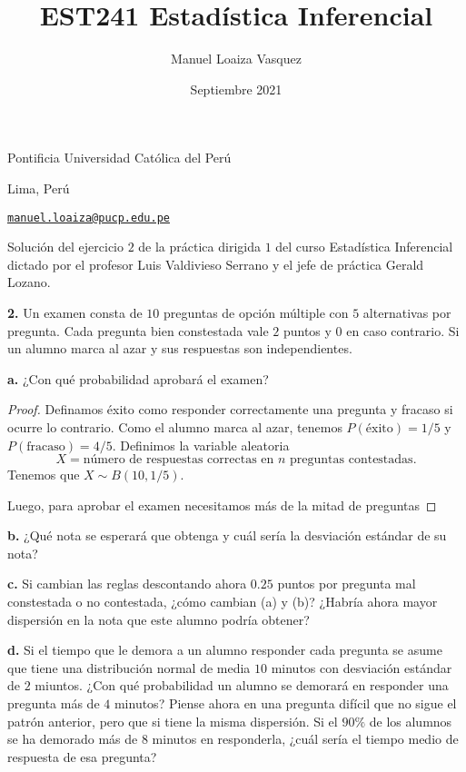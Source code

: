 \documentclass{article}
\title{EST241 Estad\'istica Inferencial}
\author{Manuel Loaiza Vasquez}
\date{Septiembre 2021}
\newenvironment{statement}[1]{\smallskip\noindent\color[rgb]{1.00,0.00,0.50} {\bf #1.}}{}
\theoremstyle{definition}
\theoremstyle{remark}
\begin{document}
\maketitle

\vspace*{-0.25in}
\centerline{Pontificia Universidad Cat\'olica del Per\'u}
\centerline{Lima, Per\'u}
\centerline{\href{mailto:manuel.loaiza@pucp.edu.pe}{{\tt manuel.loaiza@pucp.edu.pe}}}
\vspace*{0.15in}

\begin{framed}
  Soluci\'on del ejercicio $2$ de la pr\'actica dirigida $1$ del curso
  Estad\'istica Inferencial dictado por el profesor Luis Valdivieso Serrano
  y el jefe de pr\'actica Gerald Lozano.
\end{framed}

\begin{statement}{2}
    Un examen consta de $10$ preguntas de opci\'on m\'ultiple con $5$
    alternativas por pregunta.
    Cada pregunta bien constestada vale $2$ puntos y $0$ en caso contrario.
    Si un alumno marca al azar y sus respuestas son independientes.
\end{statement}

\begin{statement}{a}
  ¿Con qu\'e probabilidad aprobar\'a el examen?
\end{statement}

\begin{proof}
  Definamos \'exito como responder correctamente una pregunta y fracaso
  si ocurre lo contrario. Como el alumno marca al azar, tenemos
  $P(\text{\'exito}) = 1 / 5$ y $P(\text{fracaso}) = 4 / 5$.
  Definimos la variable aleatoria
  \[
    X = \text{n\'umero de respuestas correctas en $n$ preguntas contestadas}.
  \]
  Tenemos que $X \sim B(10, 1 / 5)$.

  Luego, para aprobar el examen necesitamos m\'as de la mitad de preguntas
\end{proof}

\begin{statement}{b}
  ¿Qu\'e nota se esperar\'a que obtenga y cu\'al ser\'ia la desviaci\'on
  est\'andar de su nota?
\end{statement}

\begin{statement}{c}
  Si cambian las reglas descontando ahora $0.25$ puntos por pregunta mal
  constestada o no contestada, ¿c\'omo cambian (a) y (b)?
  ¿Habr\'ia ahora mayor dispersi\'on en la nota que este alumno podr\'ia obtener?
\end{statement}

\begin{statement}{d}
  Si el tiempo que le demora a un alumno responder cada pregunta se asume que
  tiene una distribuci\'on normal de media $10$ minutos con desviaci\'on
  est\'andar de $2$ miuntos.
  ¿Con qu\'e probabilidad un alumno se demorar\'a en responder una pregunta
  m\'as de $4$ minutos?
  Piense ahora en una pregunta dif\'icil que no sigue el patr\'on anterior, pero
  que si tiene la misma dispersi\'on.
  Si el $90\%$ de los alumnos se ha demorado m\'as de $8$ minutos en responderla,
  ¿cu\'al ser\'ia el tiempo medio de respuesta de esa pregunta?
\end{statement}
\end{document}
